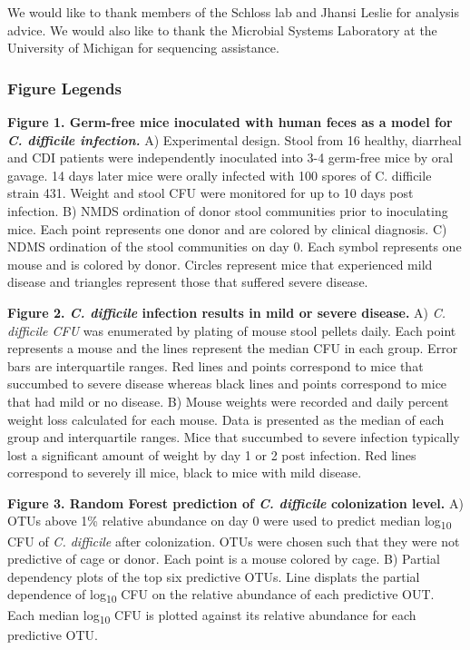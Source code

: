 \documentclass[11pt,]{article}
\begin{document}
We would like to thank members of the Schloss lab and Jhansi Leslie for
analysis advice. We would also like to thank the Microbial Systems
Laboratory at the University of Michigan for sequencing assistance.

\newpage

\subsubsection{Figure Legends}\label{figure-legends}

\textbf{Figure 1. Germ-free mice inoculated with human feces as a model
for \emph{C. difficile infection.}} A) Experimental design. Stool from
16 healthy, diarrheal and CDI patients were independently inoculated
into 3-4 germ-free mice by oral gavage. 14 days later mice were orally
infected with 100 spores of C. difficile strain 431. Weight and stool
CFU were monitored for up to 10 days post infection. B) NMDS ordination
of donor stool communities prior to inoculating mice. Each point
represents one donor and are colored by clinical diagnosis. C) NDMS
ordination of the stool communities on day 0. Each symbol represents one
mouse and is colored by donor. Circles represent mice that experienced
mild disease and triangles represent those that suffered severe disease.

\textbf{Figure 2. \emph{C. difficile} infection results in mild or
severe disease.} A) \emph{C. difficile CFU} was enumerated by plating of
mouse stool pellets daily. Each point represents a mouse and the lines
represent the median CFU in each group. Error bars are interquartile
ranges. Red lines and points correspond to mice that succumbed to severe
disease whereas black lines and points correspond to mice that had mild
or no disease. B) Mouse weights were recorded and daily percent weight
loss calculated for each mouse. Data is presented as the median of each
group and interquartile ranges. Mice that succumbed to severe infection
typically lost a significant amount of weight by day 1 or 2 post
infection. Red lines correspond to severely ill mice, black to mice with
mild disease.

\textbf{Figure 3. Random Forest prediction of \emph{C. difficile}
colonization level.} A) OTUs above 1\% relative abundance on day 0 were
used to predict median log\textsubscript{10} CFU of \emph{C. difficile}
after colonization. OTUs were chosen such that they were not predictive
of cage or donor. Each point is a mouse colored by cage. B) Partial
dependency plots of the top six predictive OTUs. Line displats the
partial dependence of log\textsubscript{10} CFU on the relative
abundance of each predictive OUT. Each median log\textsubscript{10} CFU
is plotted against its relative abundance for each predictive OTU.
\end{document}
